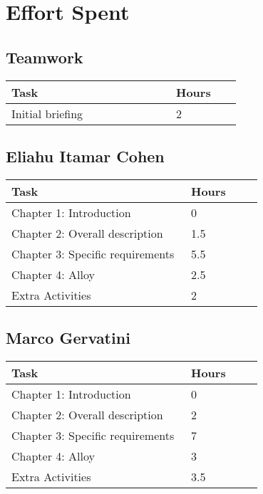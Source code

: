 \chapter{Effort Spent}

\section{Teamwork}
\begin{center}
    \begin{tabular}{@{}p{0.5\linewidth} p{0.2\linewidth}@{}}
        \hline
        \textbf{Task} & \textbf{Hours} \\ \hline
        Initial briefing & 2 \\ \hline
    \end{tabular}
\end{center}

\section{Eliahu Itamar Cohen}
\begin{center}
    \begin{tabular}{@{}p{0.5\linewidth} p{0.2\linewidth}@{}}
        \hline
        \textbf{Task} & \textbf{Hours} \\ \hline
        Chapter 1: Introduction & 0 \\ \hline
        Chapter 2: Overall description & 1.5 \\ \hline
        Chapter 3: Specific requirements & 5.5 \\ \hline
        Chapter 4: Alloy & 2.5 \\ \hline
        Extra Activities & 2 \\ \hline
    \end{tabular}
\end{center}

\section{Marco Gervatini}
\begin{center}
	\begin{tabular}{@{}p{0.5\linewidth} p{0.2\linewidth}@{}}
		\hline
		\textbf{Task} & \textbf{Hours} \\ \hline
            Chapter 1: Introduction & 0 \\ \hline
            Chapter 2: Overall description & 2 \\ \hline
            Chapter 3: Specific requirements & 7 \\ \hline
            Chapter 4: Alloy & 3 \\ \hline
            Extra Activities & 3.5 \\ \hline
	\end{tabular}
\end{center}

